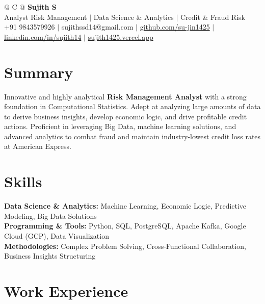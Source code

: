 \documentclass[a4paper,10pt]{article}
\newcommand{\ulink}[2]{\href{#1}{#2}}
\begin{document}
\pagestyle{empty}

\begin{tabularx}{\linewidth}{@{} C @{}}
{\color[HTML]{000000}\fontsize{30}{35}\selectfont\bfseries Sujith S} \\[5pt]
{\fontsize{10.5}{12.5}\selectfont\color[HTML]{3A3A3A}
Analyst Risk Management $|$ Data Science \& Analytics $|$ Credit \& Fraud Risk} \\[6pt]
{\fontsize{9.5}{11.5}\selectfont\textcolor[HTML]{3A3A3A}{+91 9843579926 $|$ sujithssd14@gmail.com $|$ \ulink{https://github.com/su-jin1425}{github.com/su-jin1425} $|$ \ulink{https://linkedin.com/in/sujith14}{linkedin.com/in/sujith14} $|$ \ulink{https://sujith1425.vercel.app}{sujith1425.vercel.app}}}
\end{tabularx}

\section{Summary}
\vspace{2pt}

{\color[HTML]{0A0A0A}\fontsize{11}{14}\selectfont
Innovative and highly analytical \textbf{Risk Management Analyst} with a strong foundation in Computational Statistics. Adept at analyzing large amounts of data to derive business insights, develop economic logic, and drive profitable credit actions. Proficient in leveraging Big Data, machine learning solutions, and advanced analytics to combat fraud and maintain industry-lowest credit loss rates at American Express.}

\section{Skills}
\vspace{2pt}

{\color[HTML]{0A0A0A}\fontsize{11}{14}\selectfont
\textbf{Data Science \& Analytics:} Machine Learning, Economic Logic, Predictive Modeling, Big Data Solutions \\[2pt]
\textbf{Programming \& Tools:} Python, SQL, PostgreSQL, Apache Kafka, Google Cloud (GCP), Data Visualization \\[2pt]
\textbf{Methodologies:} Complex Problem Solving, Cross-Functional Collaboration, Business Insights Structuring}

\section{Work Experience}
\vspace{2pt}
\end{document}
